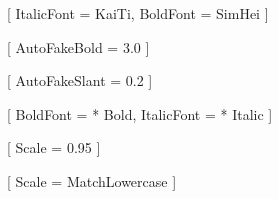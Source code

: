 %
%



\newcommand{\chuhao}{\fontsize{42pt}{50.4pt}\selectfont}      %
\newcommand{\xiaochu}{\fontsize{36pt}{43.2pt}\selectfont}     %
\newcommand{\yihao}{\fontsize{26pt}{31.2pt}\selectfont}       %
\newcommand{\xiaoyi}{\fontsize{24pt}{28.8pt}\selectfont}      %
\newcommand{\erhao}{\fontsize{22pt}{26.4pt}\selectfont}       %
\newcommand{\xiaoer}{\fontsize{18pt}{21.6pt}\selectfont}      %
\newcommand{\sanhao}{\fontsize{16pt}{19.2pt}\selectfont}      %
\newcommand{\xiaosan}{\fontsize{15pt}{18pt}\selectfont}       %
\newcommand{\sihao}{\fontsize{14pt}{16.8pt}\selectfont}       %
\newcommand{\zhongsi}{\fontsize{13pt}{15.6pt}\selectfont}     %
\newcommand{\xiaosi}{\fontsize{12pt}{14.4pt}\selectfont}      %
\newcommand{\wuhao}{\fontsize{10.5pt}{15pt}\selectfont}       %
\newcommand{\xiaowu}{\fontsize{9pt}{10.8pt}\selectfont}       %
\newcommand{\liuhao}{\fontsize{7.5pt}{9pt}\selectfont}        %
\newcommand{\xiaoliu}{\fontsize{6.5pt}{7.8pt}\selectfont}     %


[
    ItalicFont = KaiTi,      %
    BoldFont   = SimHei      %
]

[
    AutoFakeBold = 3.0       %
]

[
    AutoFakeSlant = 0.2      %
]

\setmainfont{Times New Roman}[
    BoldFont = * Bold,       %
    ItalicFont = * Italic    %
]

\setsansfont{Arial}[
    Scale = 0.95             %
]

[
    Scale = MatchLowercase  %
]

